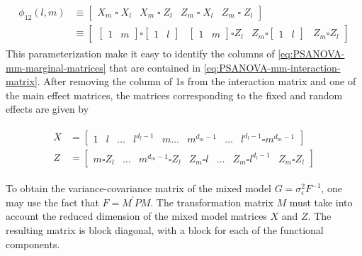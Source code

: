 \documentclass[12pt]{article}
\newcommand{\ms}{\scriptscriptstyle}
\theoremstyle{definition}
\begin{document}
\begin{align}
\begin{split}\label{eq:PSANOVA-mm-interaction-matrix}
\phi_{\ms 12}\left(l,m \right) &\equiv  \left[ \begin{array}{c|c|c|c} X_m\; \square \; X_l &  X_m\; \square \; Z_l  &  Z_m\; \square \; X_l  &  Z_m\; \square \; Z_l  \end{array} \right] \\
&\equiv 
\left[ 
\begin{array}{c|c|c|c}
 	\left[ \begin{array}{c|c} 1 & m \end{array} \right]  \square  \left[ \begin{array}{c|c} 1 & l \end{array} \right]& 
	\left[ \begin{array}{c|c} 1 & m \end{array} \right]  \square Z_l &
	 Z_m \square  \left[ \begin{array}{c|c} 1 & l \end{array} \right]  &
 	Z_m \square Z_l  
\end{array} 
\right]
\end{split}
\end{align}
This parameterization make it easy to identify the columns of \ref{eq:PSANOVA-mm-marginal-matrices} that are contained in \ref{eq:PSANOVA-mm-interaction-matrix}. After removing the column of 1s from the interaction matrix and one of the main effect matrices, the matrices corresponding to the fixed and random effects are given by 

\begin{align} 
\begin{split} \label{eq:PSANOVA-fixed-random-effect-matrices}
X &= \left[ \begin{array}{c|c|c|c|c|c|c|c|c} 1 & l  & \dots & l^{\ms d_{\ms l}-1}& m \dots & m^{\ms d_{\ms m}-1} & \dots &  l^{\ms d_{\ms l}-1} \square m^{\ms d_{\ms m}-1} \end{array} \right] \\
Z &= \left[ \begin{array}{c|c|c|c|c|c|c} m \square Z_l & \dots &  m^{\ms d_{\ms m}-1} \square Z_l & Z_m \square l & \dots & Z_m \square  l^{\ms d_{\ms l}-1} & Z_m \square Z_l \end{array} \right]
\end{split}
\end{align}

To obtain the variance-covariance matrix of the mixed model $G = \sigma_\epsilon^2 F^{-1}$, one may use the fact that $F = M^\prime P M$. The transformation matrix $M$ must take into account the reduced dimension of the mixed model matrices $X$ and $Z$. The resulting matrix is block diagonal, with a block for each of the functional components. 
\end{document}
